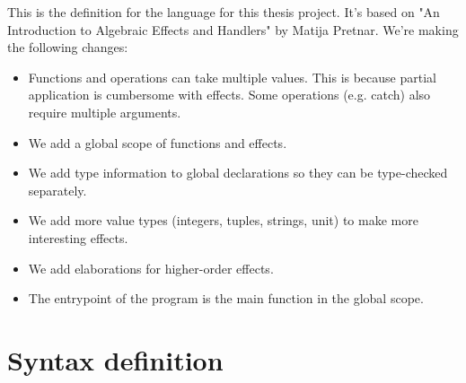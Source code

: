 \documentclass{article}
\begin{document}
This is the definition for the language for this thesis project.
It's based on "An Introduction to Algebraic Effects and Handlers" by
Matija Pretnar. We're making the following changes:

\begin{itemize}
\item Functions and operations can take multiple values. This is because partial
    application is cumbersome with effects. Some operations (e.g. catch) also
    require multiple arguments.
\item We add a global scope of functions and effects.
\item We add type information to global declarations so they can be type-checked
    separately.
\item We add more value types (integers, tuples, strings, unit) to make more
    interesting effects.
\item We add elaborations for higher-order effects. 
\item The entrypoint of the program is the main function in the global scope.
\end{itemize}

\section{Syntax definition}
\end{document}
